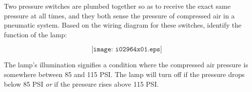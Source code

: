 

Two pressure switches are plumbed together so as to receive the exact same pressure at all times, and they both sense the pressure of compressed air in a pneumatic system.  Based on the wiring diagram for these switches, identify the function of the lamp:

$$\texttt{[image: i02964x01.eps]}$$







The lamp's illumination signifies a condition where the compressed air pressure is somewhere between 85 and 115 PSI.  The lamp will turn off if the pressure drops below 85 PSI {\it or} if the pressure rises above 115 PSI.










